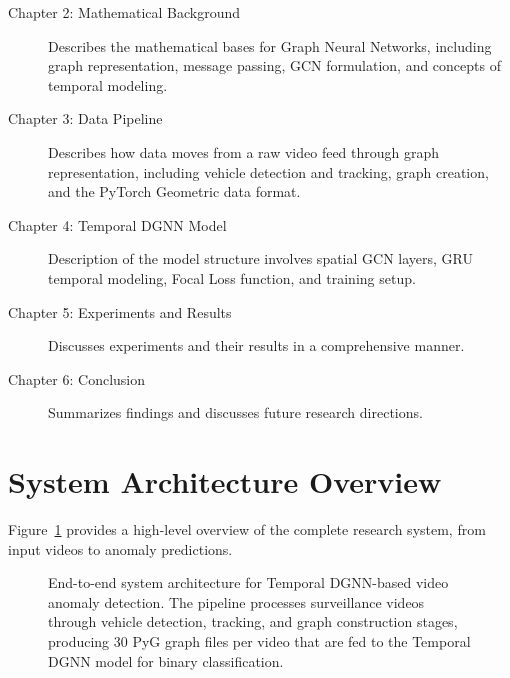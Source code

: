 \begin{description}
    \item[Chapter 2: Mathematical Background] Describes the mathematical bases for Graph Neural Networks, including graph representation, message passing, GCN formulation, and concepts of temporal modeling.
    
    \item[Chapter 3: Data Pipeline] Describes how data moves from a raw video feed through graph representation, including vehicle detection and tracking, graph creation, and the PyTorch Geometric data format.
    
    \item[Chapter 4: Temporal DGNN Model] Description of the model structure involves spatial GCN layers, GRU temporal modeling, Focal Loss function, and training setup.
    
    \item[Chapter 5: Experiments and Results] Discusses experiments and their results in a comprehensive manner.
    
    \item[Chapter 6: Conclusion] Summarizes findings and discusses future research directions.
\end{description}

\section{System Architecture Overview}

Figure~\ref{fig:system_architecture} provides a high-level overview of the complete research system, from input videos to anomaly predictions.

\begin{figure}[H]
    \centering
    
    \caption{End-to-end system architecture for Temporal DGNN-based video anomaly detection. The pipeline processes surveillance videos through vehicle detection, tracking, and graph construction stages, producing 30 PyG graph files per video that are fed to the Temporal DGNN model for binary classification.}
    \label{fig:system_architecture}
\end{figure}
